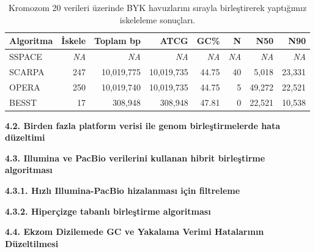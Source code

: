 \documentclass[11pt]{article}
\begin{document}
\begin{table}[htb]
\begin{center}
\begin{tabular}{|l|r|r|r|r|r|r|r}
\hline 
{\bf Algoritma } & {\bf İskele} & {\bf Toplam bp} & {\bf ATCG} & {\bf GC\%} & {\bf N} & {\bf N50} & {\bf N90} \\
\hline
SSPACE &  \textit{NA}  &  \textit{NA}     &     \textit{NA}  &   \textit{NA}   &  \textit{NA}    &  \textit{NA}    &  \textit{NA}   \\
SCARPA &   247	& 10,019,775 &	10,019,735	& 44.75	& 40	& 5,018 &	23,331\\
OPERA  &  250	& 10,019,740	& 10,019,735	& 44.75	& 5	& 49,272	& 22,521 \\
BESST  &  17    & 308,948 & 308,948  & 47.81 & 0  & 22,521 & 10,538 \\ \hline
\end{tabular}
\end{center}
\caption{Kromozom 20 verileri üzerinde BYK havuzlarını sırayla birleştirerek yaptığımız iskeleleme sonuçları.}
\label{tab:chr20h}
\end{table}

\clearpage

{\bf \large 4.2. Birden fazla platform verisi ile genom birleştirmelerde hata düzeltimi}



\clearpage

{\bf \large 4.3. Illumina ve PacBio verilerini kullanan hibrit birleştirme algoritması}

{\bf 4.3.1. Hızlı Illumina-PacBio hizalanması için filtreleme}



{\bf 4.3.2. Hiperçizge tabanlı birleştirme algoritması}




\clearpage

\noindent
{\bf \large 4.4. Ekzom Dizilemede GC ve Yakalama Verimi Hatalarının Düzeltilmesi}
\end{document}

